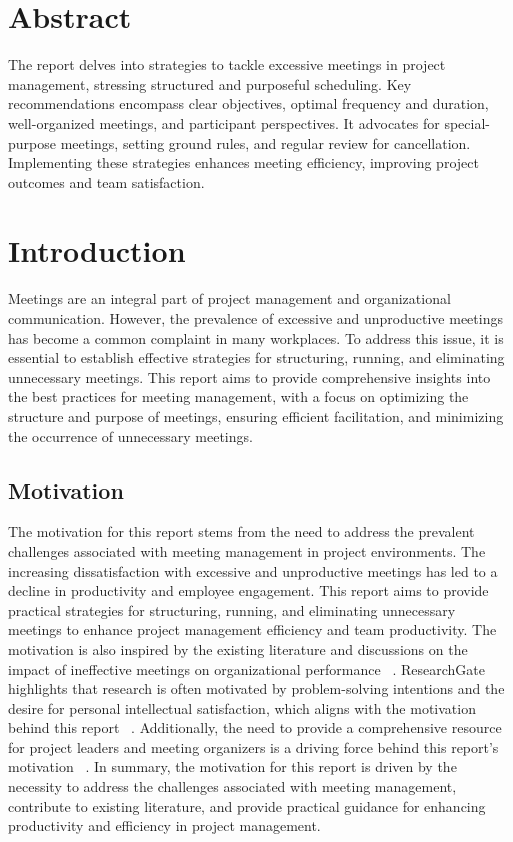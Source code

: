 \newpage
\section{Abstract}
    The report delves into strategies to tackle excessive meetings in project management, stressing structured and purposeful scheduling. Key recommendations encompass clear objectives, optimal frequency and duration, well-organized meetings, and participant perspectives. It advocates for special-purpose meetings, setting ground rules, and regular review for cancellation. Implementing these strategies enhances meeting efficiency, improving project outcomes and team satisfaction.
\section{Introduction}
Meetings are an integral part of project management and organizational communication. However, the prevalence of excessive and unproductive meetings has become a common complaint in many workplaces. To address this issue, it is essential to establish effective strategies for structuring, running, and eliminating unnecessary meetings. This report aims to provide comprehensive insights into the best practices for meeting management, with a focus on optimizing the structure and purpose of meetings, ensuring efficient facilitation, and minimizing the occurrence of unnecessary meetings.
\subsection{Motivation}
The motivation for this report stems from the need to address the prevalent challenges associated with meeting management in project environments. The increasing dissatisfaction with excessive and unproductive meetings has led to a decline in productivity and employee engagement. This report aims to provide practical strategies for structuring, running, and eliminating unnecessary meetings to enhance project management efficiency and team productivity.
The motivation is also inspired by the existing literature and discussions on the impact of ineffective meetings on organizational performance
~\cite{01}. ResearchGate highlights that research is often motivated by problem-solving intentions and the desire for personal intellectual satisfaction, which aligns with the motivation behind this report
~\cite{01}. Additionally, the need to provide a comprehensive resource for project leaders and meeting organizers is a driving force behind this report's motivation ~\cite{02}.
In summary, the motivation for this report is driven by the necessity to address the challenges associated with meeting management, contribute to existing literature, and provide practical guidance for enhancing productivity and efficiency in project management.

